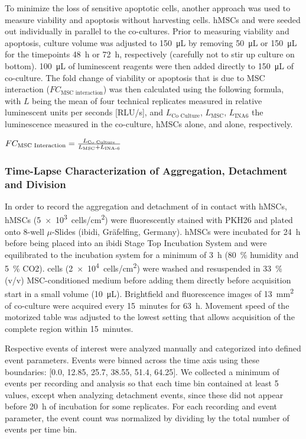 To minimize the loss of sensitive apoptotic cells, another approach was used to
measure viability and apoptosis without harvesting \INA cells. hMSCs and \INA
were seeded out individually in parallel to the co-cultures. Prior to measuring viability and
apoptosis, culture volume was adjusted to \SI{150}{\micro\liter} by removing
\SI{50}{\micro\liter} or \SI{150}{\micro\liter} for the timepoints
\SI{48}{\hour} or \SI{72}{\hour}, respectively (carefully not to stir up culture
on bottom). \SI{100}{\micro\liter} of luminescent reagents were then added
directly to \SI{150}{\micro\liter} of co-culture. The fold change of viability
or apoptosis that is due to MSC interaction (\(FC_{\text{MSC interaction}}\))
was then calculated using the following formula, with \(L\) being the mean of
four technical replicates measured in relative luminescent units per seconds
    [RLU/s], and \(L_{\text{Co Culture}}\), \(L_{\text{MSC}}\), \(L_{\text{INA6}}\) the
luminescence measured in the co-culture, hMSCs alone, and \INA alone,
respectively.

\begin{center}
    $FC_{\text{MSC Interaction}}=\frac{L_{\text{Co Culture}}}{L_{\text{MSC}}  + L_{\text{\mbox{INA-6}}}}$
\end{center}



\subsubsection*{Time-Lapse Characterization of \INA Aggregation, Detachment and Division}
In order to record the aggregation and detachment of \INA in contact with
hMSCs, hMSCs (\SI{5e3}{cells/cm^2}) were fluorescently stained with PKH26 and
plated onto 8-well \(\mu\)-Slides (ibidi, Gräfelfing, Germany). hMSCs were
incubated for \SI{24}{\hour} before being placed into an ibidi Stage Top
Incubation System and were equilibrated to the incubation system for a minimum
of \SI{3}{\hour} (\SI{80}{\percent} humidity and \SI{5}{\percent} CO2). \INA
cells (\SI{2e4}{cells/cm^2}) were washed and resuspended in \SI{33}{\percent}
(v/v) MSC-conditioned medium before adding them directly before acquisition
start in a small volume (\SI{10}{\micro\liter}). Brightfield and fluorescence
images of \SI{13}{mm^2} of co-culture were acquired every \SI{15}{minutes} for
\SI{63}{\hour}. Movement speed of the motorized table was adjusted to the lowest
setting that allows acquisition of the complete region within \SI{15}{minutes}.

Respective events of interest were analyzed manually and categorized into
defined event parameters. Events were binned across the time axis using these
boundaries: [0.0, 12.85, 25.7, 38.55, 51.4, 64.25]. We collected a minimum of
events per recording and analysis so that each time bin contained at least 5
values, except when analyzing detachment events, since these did not appear
before \SI{20}{\hour} of incubation for some replicates. For each recording and
event parameter, the event count was normalized by dividing by the total number
of events per time bin.

